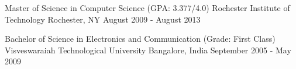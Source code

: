 

\begin{cventries}

  \cventry
    {Master of Science in Computer Science (GPA: 3.377/4.0)} %
    {Rochester Institute of Technology} %
    {Rochester, NY} %
    {August 2009 - August 2013} %
    {
    }

\vspace{\acvSectionContentTopSkip}
\vspace{-6mm}
  \cventry
    {Bachelor of Science in Electronics and Communication (Grade: First Class)} %
    {Visveswaraiah Technological University} %
    {Bangalore, India} %
    {September 2005 - May 2009}{} %
\end{cventries}
